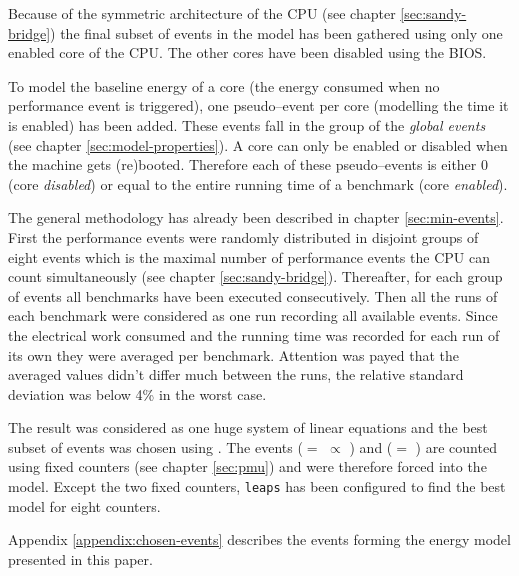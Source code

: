 \label{sec:finding-useful-subset}

Because of the symmetric architecture of the CPU (see chapter
\ref{sec:sandy-bridge}) the final subset of events in the model has been
gathered using only one enabled core of the CPU. The other cores have been
disabled using the BIOS.

To model the baseline energy of a core (the energy consumed when no performance
event is triggered), one pseudo--event per core (modelling the time it is
enabled) has been added. These events fall in the group of the \emph{global
events} (see chapter \ref{sec:model-properties}). A core can only be enabled or
disabled when the machine gets (re)booted. Therefore each of these
pseudo--events is either $0$ (core \emph{disabled}) or equal to the
entire running time of a benchmark (core \emph{enabled}).

The general methodology has already been described in chapter
\ref{sec:min-events}.  First the performance events were randomly
distributed in disjoint groups of eight events which is the maximal number of
performance events the CPU can count simultaneously (see chapter
\ref{sec:sandy-bridge}). Thereafter, for each group of events all benchmarks
have been executed consecutively. Then all the runs of each benchmark were
considered as one run recording all available events. Since the electrical
work consumed and the running time was recorded for each run of its own they
were averaged per benchmark. Attention was payed that the averaged values didn't
differ much between the runs, the relative standard deviation was below 4\% in
the worst case.

The result was considered as one huge system of linear equations and the best
subset of events was chosen using \JWTleaps{}. The events \JWctrCLK{} ($=$
 $\propto$
) and \JWctrINST{} ($=$
) are counted using fixed counters (see chapter
\ref{sec:pmu}) and were therefore forced into the model. Except the two fixed
counters, \texttt{leaps} has been configured to find the best model for eight
counters.

Appendix \ref{appendix:chosen-events} describes the events forming the energy
model presented in this paper.


\label{sec:final-model}

